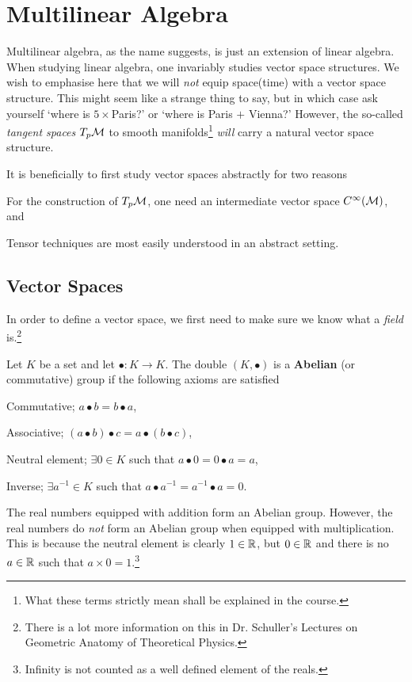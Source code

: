 \chapter{Multilinear Algebra}

Multilinear algebra, as the name suggests, is just an extension of linear algebra. When studying linear algebra, one invariably studies vector space structures. We wish to emphasise here that we will \textit{not} equip space(time) with a vector space structure. This might seem like a strange thing to say, but in which case ask yourself `where is $5\times$Paris?' or `where is Paris $+$ Vienna?' However, the so-called \textit{tangent spaces} $T_p\mathcal{M}$ to smooth manifolds\footnote{What these terms strictly mean shall be explained in the course.} \textit{will} carry a natural vector space structure. 

It is beneficially to first study vector spaces abstractly for two reasons 
\benr 
    \item For the construction of $T_p\mathcal{M}$, one need an intermediate vector space $C^{\infty}(\mathcal{M})$, and  
    \item Tensor techniques are most easily understood in an abstract setting. 
\een 

\section{Vector Spaces}

In order to define a vector space, we first need to make sure we know what a \textit{field} is.\footnote{There is a lot more information on this in Dr. Schuller's Lectures on Geometric Anatomy of Theoretical Physics.} 

    Let $K$ be a set and let $\bullet:K\to K$. The double $(K,\bullet)$ is a \textbf{Abelian} (or commutative) group if the following axioms are satisfied
    \benr 
        \item Commutative; $a\bullet b = b\bullet a$,
        \item Associative;  $(a\bullet b)\bullet c = a\bullet (b\bullet c)$,
        \item Neutral element; $\exists 0\in K$ such that $a\bullet 0 = 0\bullet a = a$, 
        \item Inverse; $\exists a^{-1} \in K$ such that $a\bullet a^{-1} = a^{-1}\bullet a = 0$.
    \een 
\ed 

\bex 
    The real numbers equipped with addition form an Abelian group. However, the real numbers do \textit{not} form an Abelian group when equipped with multiplication. This is because the neutral element is clearly $1\in\mathbb{R}$, but $0\in\mathbb{R}$ and there is no $a\in\mathbb{R}$ such that $a\times 0 =1$.\footnote{Infinity is not counted as a well defined element of the reals.} 
\eex 

